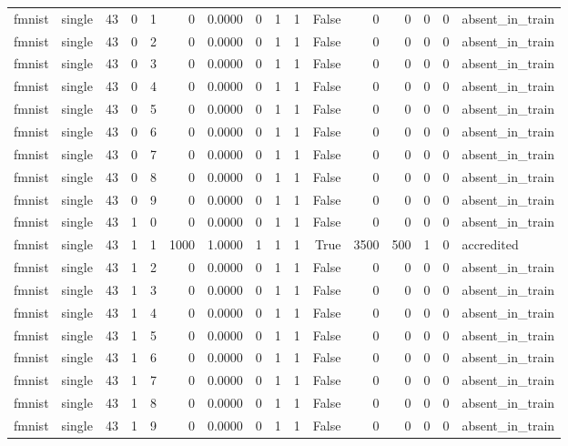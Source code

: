 \begin{tabular}{llrrrrrrrrrrrrrl}
fmnist & single & 43 & 0 & 1 & 0 & 0.0000 & 0 & 1 & 1 & False & 0 & 0 & 0 & 0 & absent\_in\_train \\
fmnist & single & 43 & 0 & 2 & 0 & 0.0000 & 0 & 1 & 1 & False & 0 & 0 & 0 & 0 & absent\_in\_train \\
fmnist & single & 43 & 0 & 3 & 0 & 0.0000 & 0 & 1 & 1 & False & 0 & 0 & 0 & 0 & absent\_in\_train \\
fmnist & single & 43 & 0 & 4 & 0 & 0.0000 & 0 & 1 & 1 & False & 0 & 0 & 0 & 0 & absent\_in\_train \\
fmnist & single & 43 & 0 & 5 & 0 & 0.0000 & 0 & 1 & 1 & False & 0 & 0 & 0 & 0 & absent\_in\_train \\
fmnist & single & 43 & 0 & 6 & 0 & 0.0000 & 0 & 1 & 1 & False & 0 & 0 & 0 & 0 & absent\_in\_train \\
fmnist & single & 43 & 0 & 7 & 0 & 0.0000 & 0 & 1 & 1 & False & 0 & 0 & 0 & 0 & absent\_in\_train \\
fmnist & single & 43 & 0 & 8 & 0 & 0.0000 & 0 & 1 & 1 & False & 0 & 0 & 0 & 0 & absent\_in\_train \\
fmnist & single & 43 & 0 & 9 & 0 & 0.0000 & 0 & 1 & 1 & False & 0 & 0 & 0 & 0 & absent\_in\_train \\
fmnist & single & 43 & 1 & 0 & 0 & 0.0000 & 0 & 1 & 1 & False & 0 & 0 & 0 & 0 & absent\_in\_train \\
fmnist & single & 43 & 1 & 1 & 1000 & 1.0000 & 1 & 1 & 1 & True & 3500 & 500 & 1 & 0 & accredited \\
fmnist & single & 43 & 1 & 2 & 0 & 0.0000 & 0 & 1 & 1 & False & 0 & 0 & 0 & 0 & absent\_in\_train \\
fmnist & single & 43 & 1 & 3 & 0 & 0.0000 & 0 & 1 & 1 & False & 0 & 0 & 0 & 0 & absent\_in\_train \\
fmnist & single & 43 & 1 & 4 & 0 & 0.0000 & 0 & 1 & 1 & False & 0 & 0 & 0 & 0 & absent\_in\_train \\
fmnist & single & 43 & 1 & 5 & 0 & 0.0000 & 0 & 1 & 1 & False & 0 & 0 & 0 & 0 & absent\_in\_train \\
fmnist & single & 43 & 1 & 6 & 0 & 0.0000 & 0 & 1 & 1 & False & 0 & 0 & 0 & 0 & absent\_in\_train \\
fmnist & single & 43 & 1 & 7 & 0 & 0.0000 & 0 & 1 & 1 & False & 0 & 0 & 0 & 0 & absent\_in\_train \\
fmnist & single & 43 & 1 & 8 & 0 & 0.0000 & 0 & 1 & 1 & False & 0 & 0 & 0 & 0 & absent\_in\_train \\
fmnist & single & 43 & 1 & 9 & 0 & 0.0000 & 0 & 1 & 1 & False & 0 & 0 & 0 & 0 & absent\_in\_train \\

\end{tabular}
